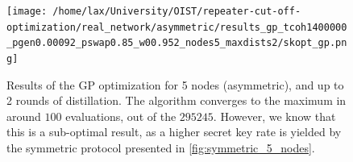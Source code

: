 \documentclass{article}
\begin{document}
\begin{figure}[ht!]
  \centering
  \texttt{[image: /home/lax/University/OIST/repeater-cut-off-optimization/real\_network/asymmetric/results\_gp\_tcoh1400000\_pgen0.00092\_pswap0.85\_w00.952\_nodes5\_maxdists2/skopt\_gp.png]}
  \caption{Results of the GP optimization for 5 nodes (asymmetric), and up to 2 rounds of distillation. The algorithm converges to the maximum in around $100$ evaluations, out of the $295245$. However, we know that this is a sub-optimal result, as a higher secret key rate is yielded by the symmetric protocol presented in \ref{fig:symmetric_5_nodes}.}
  \label{fig:asymmetric_5_nodes}
\end{figure}
\end{document}
